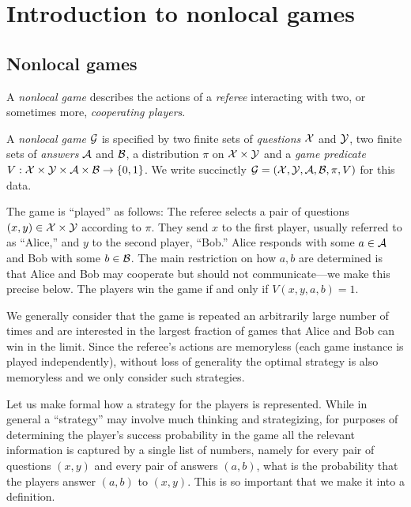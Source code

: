
\chapter{Introduction to nonlocal games}

\section{Nonlocal games}

A \emph{nonlocal game} describes the actions of a \emph{referee} interacting with two, or sometimes more, \emph{cooperating players}. 

\begin{definition}
A \emph{nonlocal game} $\mathcal{G}$ is specified by two finite sets of \emph{questions} $\mathcal{X}$ and $\mathcal{Y}$, two finite sets of \emph{answers} $\mathcal{A}$ and $\mathcal{B}$, a distribution $\pi$ on $\mathcal{X}\times \mathcal{Y}$ and a \emph{game predicate} $V: \mathcal{X}\times \mathcal{Y} \times \mathcal{A}\times \mathcal{B} \to \{0,1\}$. We write succinctly $\mathcal{G}=(\mathcal{X},\mathcal{Y},\mathcal{A},\mathcal{B},\pi,V)$ for this data. 
\end{definition}

The game is ``played'' as follows: The referee selects a pair of questions $(x,y)\in\mathcal{X}\times \mathcal{Y}$ according to $\pi$. They send $x$ to the first player, usually referred to as ``Alice,'' and $y$ to the second player, ``Bob.'' Alice responds with some $a\in \mathcal{A}$ and Bob with some $b\in \mathcal{B}$. The main restriction on how $a,b$ are determined is that Alice and Bob may cooperate but should not communicate---we make this precise below. The players win the game if and only if $V(x,y,a,b)=1$. 

We generally consider that the game is repeated an arbitrarily large number of times and are interested in the largest fraction of games that Alice and Bob can win in the limit. Since the referee's actions are memoryless (each game instance is played independently), without loss of generality the optimal strategy is also memoryless and we only consider such strategies.

Let us make formal how a strategy for the players is represented. While in general a ``strategy'' may involve much thinking and strategizing, for purposes of determining the player's success probability in the game all the relevant information is captured by a single list of numbers, namely for every pair of questions $(x,y)$ and every pair of answers $(a,b)$, what is the probability that the players answer $(a,b)$ to $(x,y)$. This is so important that we make it into a definition.

